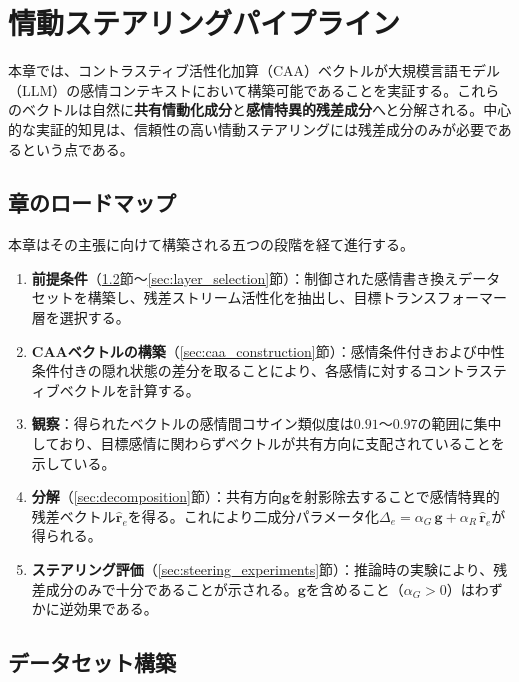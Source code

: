 \chapter{情動ステアリングパイプライン}
\label{chap:development1_emo_steering}

本章では、コントラスティブ活性化加算（CAA）ベクトルが大規模言語モデル（LLM）の感情コンテキストにおいて構築可能であることを実証する。これらのベクトルは自然に\textbf{共有情動化成分}と\textbf{感情特異的残差成分}へと分解される。中心的な実証的知見は、信頼性の高い情動ステアリングには残差成分のみが必要であるという点である。

\section{章のロードマップ}
\label{sec:steering_roadmap_1}
本章はその主張に向けて構築される五つの段階を経て進行する。

\begin{enumerate}
  \item \textbf{前提条件}（\ref{sec:dataset_construction}節〜\ref{sec:layer_selection}節）：制御された感情書き換えデータセットを構築し、残差ストリーム活性化を抽出し、目標トランスフォーマー層を選択する。

  \item \textbf{CAAベクトルの構築}（\ref{sec:caa_construction}節）：感情条件付きおよび中性条件付きの隠れ状態の差分を取ることにより、各感情に対するコントラスティブベクトルを計算する。

  \item \textbf{観察}：得られたベクトルの感情間コサイン類似度は$0.91$〜$0.97$の範囲に集中しており、目標感情に関わらずベクトルが共有方向に支配されていることを示している。

  \item \textbf{分解}（\ref{sec:decomposition}節）：共有方向$\mathbf{g}$を射影除去することで感情特異的残差ベクトル$\hat{\mathbf{r}}_e$を得る。これにより二成分パラメータ化$\Delta_e = \alpha_G\,\mathbf{g}+\alpha_R\,\hat{\mathbf{r}}_e$が得られる。

  \item \textbf{ステアリング評価}（\ref{sec:steering_experiments}節）：推論時の実験により、残差成分のみで十分であることが示される。$\mathbf{g}$を含めること（$\alpha_G > 0$）はわずかに逆効果である。
\end{enumerate}

\section{データセット構築}\label{sec:dataset_construction}

